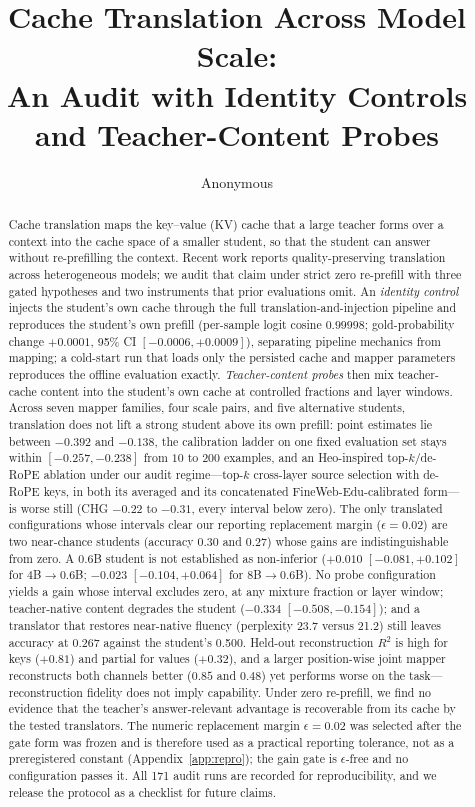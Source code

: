 \documentclass{article} %
\title{Cache Translation Across Model Scale:\\
An Audit with Identity Controls and Teacher-Content Probes}
\author{Anonymous}
\date{}
\begin{document}
\maketitle

\begin{abstract}
Cache translation maps the key--value (KV) cache that a large teacher forms
over a context into the cache space of a smaller student, so that the student
can answer without re-prefilling the context. Recent work reports
quality-preserving translation across heterogeneous models; we audit that claim
under strict zero re-prefill with three gated hypotheses and two instruments
that prior evaluations omit. An \emph{identity control} injects the student's
own cache through the full translation-and-injection pipeline and reproduces
the student's own prefill (per-sample logit cosine $0.99998$; gold-probability
change $+0.0001$, 95\% CI $[-0.0006, +0.0009]$), separating pipeline mechanics
from mapping; a cold-start run that loads only the persisted cache and mapper
parameters reproduces the offline evaluation exactly. \emph{Teacher-content probes} then mix teacher-cache content into the
student's own cache at controlled fractions and layer windows. Across seven
mapper families, four scale pairs, and five alternative students, translation
does not lift a strong student above its own
prefill: point estimates lie between $-0.392$ and $-0.138$, the calibration
ladder on one fixed evaluation set stays within $[-0.257, -0.238]$ from $10$ to
$200$ examples, and an Heo-inspired top-$k$/de-RoPE ablation under our audit regime---top-$k$ cross-layer source selection with
de-RoPE keys, in both its averaged and its concatenated FineWeb-Edu-calibrated form---is worse still (CHG $-0.22$ to $-0.31$, every interval below zero).
The only translated configurations whose intervals clear our reporting replacement margin ($\epsilon{=}0.02$) are two near-chance students (accuracy
$0.30$ and $0.27$) whose gains are indistinguishable from zero. A 0.6B student is not established as
non-inferior ($+0.010$ $[-0.081, +0.102]$ for 4B$\to$0.6B; $-0.023$
$[-0.104, +0.064]$ for 8B$\to$0.6B). No probe configuration yields a gain whose
interval excludes zero, at any mixture fraction or layer window; teacher-native
content degrades the student ($-0.334$ $[-0.508, -0.154]$); and a translator
that restores near-native fluency (perplexity 23.7 versus 21.2) still leaves
accuracy at 0.267 against the student's 0.500. Held-out reconstruction $R^2$ is
high for keys ($+0.81$) and partial for values ($+0.32$), and a larger
position-wise joint mapper reconstructs both channels better ($0.85$ and $0.48$)
yet performs worse on the task---reconstruction fidelity does not imply
capability. Under zero
re-prefill, we find no evidence that the teacher's answer-relevant advantage is
recoverable from its cache by the tested translators. The numeric replacement margin $\epsilon{=}0.02$ was selected after the gate form was frozen and is therefore used as a practical reporting tolerance, not as a preregistered constant (Appendix~\ref{app:repro}); the gain gate is $\epsilon$-free and no configuration passes it. All 171 audit runs are
recorded for reproducibility, and we release the protocol as a checklist for
future claims.
\end{abstract}
\end{document}
